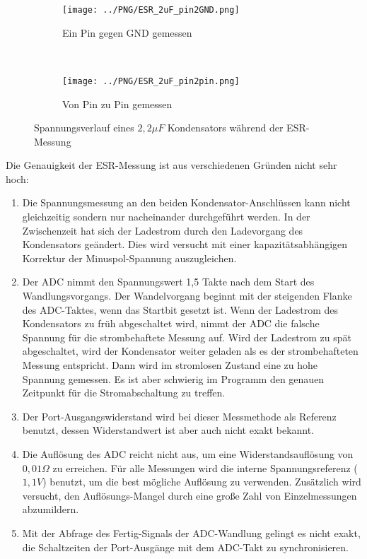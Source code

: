 \begin{figure}[H]
  \begin{subfigure}[b]{9cm}
    \centering
    \texttt{[image: ../PNG/ESR\_2uF\_pin2GND.png]}
    \caption{Ein Pin gegen GND gemessen}
  \end{subfigure}
  ~
  \begin{subfigure}[b]{9cm}
    \centering
    \texttt{[image: ../PNG/ESR\_2uF\_pin2pin.png]}
    \caption{Von Pin zu Pin gemessen}
  \end{subfigure}
  \caption{Spannungsverlauf eines \(2,2\mu F\) Kondensators während der ESR-Messung}
  \label{pic:esr2}
\end{figure}

Die Genauigkeit der ESR-Messung ist aus verschiedenen Gründen nicht sehr hoch:
\begin{enumerate}
\item Die Spannungsmessung an den beiden Kondensator-Anschlüssen kann nicht gleichzeitig sondern nur nacheinander durchgeführt werden.
 In der Zwischenzeit hat sich der Ladestrom durch den Ladevorgang des Kondensators geändert.
Dies wird versucht mit einer kapazitätsabhängigen Korrektur der Minuspol-Spannung auszugleichen.
\item Der ADC nimmt den Spannungswert 1,5 Takte nach dem Start des Wandlungsvorgangs. Der Wandelvorgang beginnt mit
der steigenden Flanke des ADC-Taktes, wenn das Startbit gesetzt ist. Wenn der Ladestrom des Kondensators zu früh abgeschaltet wird,
nimmt der ADC die falsche Spannung für die strombehaftete Messung auf. Wird der Ladestrom zu spät abgeschaltet, wird
der Kondensator weiter geladen als es der strombehafteten Messung entspricht.
Dann wird im stromlosen Zustand eine zu hohe Spannung gemessen.
Es ist aber schwierig im Programm den genauen Zeitpunkt für die Stromabschaltung zu treffen.
\item Der Port-Ausgangswiderstand wird bei dieser Messmethode als Referenz benutzt, dessen Widerstandwert
ist aber auch nicht exakt bekannt.
\item Die Auflösung des ADC reicht nicht aus, um eine Widerstandsauflösung von \(0,01\Omega\) zu erreichen.
Für alle Messungen wird die interne Spannungsreferenz (\(1,1V\)) benutzt, um die best mögliche Auflösung zu verwenden.
Zusätzlich wird versucht, den Auflösungs-Mangel durch eine große Zahl von Einzelmessungen abzumildern.
\item Mit der Abfrage des Fertig-Signals der ADC-Wandlung gelingt es nicht exakt, die Schaltzeiten der Port-Ausgänge mit dem
ADC-Takt zu synchronisieren.
\end{enumerate}

